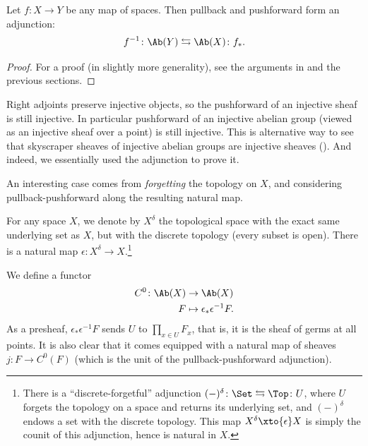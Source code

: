 \documentclass[11pt]{amsart}
\begin{document}
\begin{proposition}\label{prop:pullback-pushforward-adjunction} Let $f \colon X \to Y$ be any map of spaces. Then pullback and pushforward form an adjunction:
\begin{align*}
    f^{-1} \colon \Ab(Y) \leftrightarrows \Ab(X) \colon f_\ast.
\end{align*}
\end{proposition}
\begin{proof} For a proof (in slightly more generality), see the arguments in \cite[008P]{Stacks} and the previous sections.
\end{proof}

\begin{remark} Right adjoints preserve injective objects, so the pushforward of an injective sheaf is still injective. In particular pushforward of an injective abelian group (viewed as an injective sheaf over a point) is still injective. This is alternative way to see that skyscraper sheaves of injective abelian groups are injective sheaves (). And indeed, we essentially used the adjunction  to prove it.
\end{remark}

An interesting case comes from \emph{forgetting} the topology on $X$, and considering pullback-pushforward along the resulting natural map.

\begin{notation} For any space $X$, we denote by $X^\delta$ the topological space with the exact same underlying set as $X$, but with the discrete topology (every subset is open). There is a natural map $\epsilon \colon X^\delta \to X$.\footnote{There is a ``discrete-forgetful'' adjunction $(-)^\delta \colon \Set \leftrightarrows \Top \colon U$, where $U$ forgets the topology on a space and returns its underlying set, and $(-)^\delta$ endows a set with the discrete topology. This map $X^\delta \xto{\epsilon} X$ is simply the counit of this adjunction, hence is natural in $X$.}
\end{notation}

We define a functor
\begin{align*}
    C^0 \colon \Ab(X) &\to \Ab(X) \\
    F &\mapsto \epsilon_\ast \epsilon^{-1} F.
\end{align*}
%
As a presheaf, $\epsilon_\ast \epsilon^{-1} F$ sends $U$ to $\prod_{x\in U} F_x$, that is, it is the sheaf of germs at all points. It is also clear that it comes equipped with a natural map of sheaves $j \colon F \to C^0(F)$ (which is the unit of the pullback-pushforward adjunction).
\end{document}
